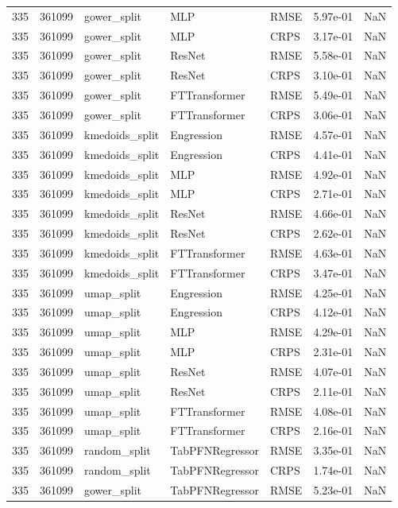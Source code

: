 \begin{tabular}{rrlllrr}
335 & 361099 & gower\_split & MLP & RMSE & 5.97e-01 & NaN \\
335 & 361099 & gower\_split & MLP & CRPS & 3.17e-01 & NaN \\
335 & 361099 & gower\_split & ResNet & RMSE & 5.58e-01 & NaN \\
335 & 361099 & gower\_split & ResNet & CRPS & 3.10e-01 & NaN \\
335 & 361099 & gower\_split & FTTransformer & RMSE & 5.49e-01 & NaN \\
335 & 361099 & gower\_split & FTTransformer & CRPS & 3.06e-01 & NaN \\
335 & 361099 & kmedoids\_split & Engression & RMSE & 4.57e-01 & NaN \\
335 & 361099 & kmedoids\_split & Engression & CRPS & 4.41e-01 & NaN \\
335 & 361099 & kmedoids\_split & MLP & RMSE & 4.92e-01 & NaN \\
335 & 361099 & kmedoids\_split & MLP & CRPS & 2.71e-01 & NaN \\
335 & 361099 & kmedoids\_split & ResNet & RMSE & 4.66e-01 & NaN \\
335 & 361099 & kmedoids\_split & ResNet & CRPS & 2.62e-01 & NaN \\
335 & 361099 & kmedoids\_split & FTTransformer & RMSE & 4.63e-01 & NaN \\
335 & 361099 & kmedoids\_split & FTTransformer & CRPS & 3.47e-01 & NaN \\
335 & 361099 & umap\_split & Engression & RMSE & 4.25e-01 & NaN \\
335 & 361099 & umap\_split & Engression & CRPS & 4.12e-01 & NaN \\
335 & 361099 & umap\_split & MLP & RMSE & 4.29e-01 & NaN \\
335 & 361099 & umap\_split & MLP & CRPS & 2.31e-01 & NaN \\
335 & 361099 & umap\_split & ResNet & RMSE & 4.07e-01 & NaN \\
335 & 361099 & umap\_split & ResNet & CRPS & 2.11e-01 & NaN \\
335 & 361099 & umap\_split & FTTransformer & RMSE & 4.08e-01 & NaN \\
335 & 361099 & umap\_split & FTTransformer & CRPS & 2.16e-01 & NaN \\
335 & 361099 & random\_split & TabPFNRegressor & RMSE & 3.35e-01 & NaN \\
335 & 361099 & random\_split & TabPFNRegressor & CRPS & 1.74e-01 & NaN \\
335 & 361099 & gower\_split & TabPFNRegressor & RMSE & 5.23e-01 & NaN \\

\end{tabular}
